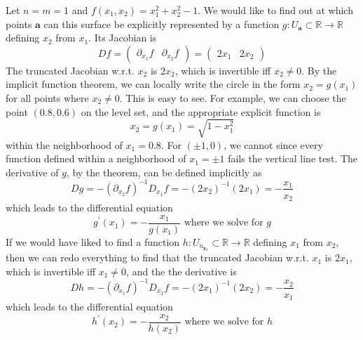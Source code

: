   \begin{example}
    Let $n = m = 1$ and $f(x_1, x_2) = x_1^2 + x_2^2 - 1$. We would like to find out at which points $\mathbf{a}$ can this surface be explicitly represented by a function $g: U_\mathbf{a} \subset \mathbb{R} \longrightarrow \mathbb{R}$ defining $x_2$ from $x_1$. Its Jacobian is 
    \[D f = \begin{pmatrix} \partial_{x_1} f & \partial_{x_2} f \end{pmatrix} = \begin{pmatrix} 2 x_1 & 2x_2 \end{pmatrix} \]
    The truncated Jacobian w.r.t. $x_2$ is $2 x_2$, which is invertible iff $x_2 \neq 0$. By the implicit function theorem, we can locally write the circle in the form $x_2 = g(x_1)$ for all points where $x_2 \neq 0$. This is easy to see. For example, we can choose the point $(0.8, 0.6)$ on the level set, and the appropriate explicit function is 
    \[x_2 = g(x_1) = \sqrt{1 - x_1^2}\]
    within the neighborhood of $x_1 = 0.8$. For $(\pm 1, 0)$, we cannot since every function defined within a neighborhood of $x_1 = \pm 1$ fails the vertical line test. The derivative of $g$, by the theorem, can be defined implicitly as 
    \[D g = - ( \partial_{x_2} f)^{-1} D_{x_1} f = - (2 x_2)^{-1} (2 x_1) = -\frac{x_1}{x_2}\]
    which leads to the differential equation 
    \[g^\prime (x_1) = - \frac{x_1}{g(x_1)} \text{ where we solve for } g\]
    If we would have liked to find a function $h: U_{a_{\mathbf{x}_2}} \subset \mathbb{R} \longrightarrow \mathbb{R}$ defining $x_1$ from $x_2$, then we can redo everything to find that the truncated Jacobian w.r.t. $x_1$ is $2x_1$, which is invertible iff $x_1 \neq 0$, and the the derivative is 
    \[D h = - (\partial_{x_1} f)^{-1} D_{x_2} f = - (2x_1)^{-1} (2x_2) = -\frac{x_2}{x_1}\]
    which leads to the differential equation 
    \[h^\prime (x_2) = - \frac{x_2}{h(x_2)} \text{ where we solve for } h\]
  \end{example}

